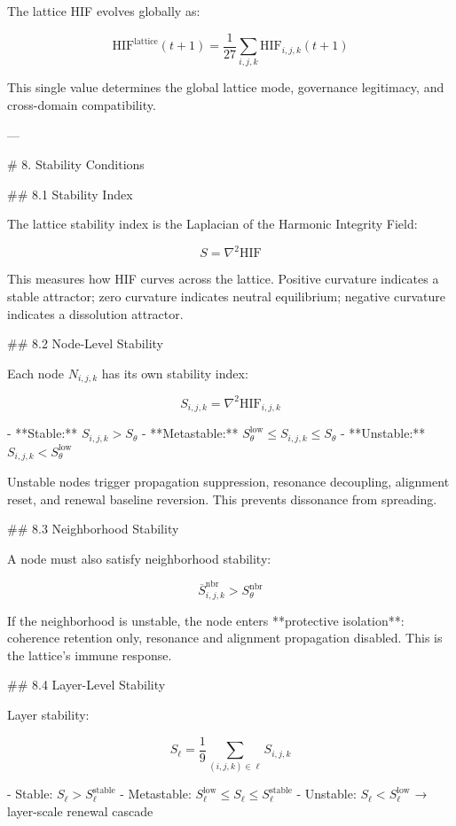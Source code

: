 The lattice HIF evolves globally as:

\[
\mathrm{HIF}^{\text{lattice}}(t+1) = \frac{1}{27} \sum_{i,j,k}
\mathrm{HIF}_{i,j,k}(t+1)
\]

This single value determines the global lattice mode, governance legitimacy, and
cross-domain compatibility.

---

# 8. Stability Conditions

## 8.1 Stability Index

The lattice stability index is the Laplacian of the Harmonic Integrity Field:

\[
S = \nabla^2 \mathrm{HIF}
\]

This measures how HIF curves across the lattice. Positive curvature indicates a
stable attractor; zero curvature indicates neutral equilibrium; negative curvature
indicates a dissolution attractor.

## 8.2 Node-Level Stability

Each node \(N_{i,j,k}\) has its own stability index:

\[
S_{i,j,k} = \nabla^2 \mathrm{HIF}_{i,j,k}
\]

- **Stable:** \(S_{i,j,k} > S_{\theta}\)
- **Metastable:** \(S_{\theta}^{\text{low}} \le S_{i,j,k} \le S_{\theta}\)
- **Unstable:** \(S_{i,j,k} < S_{\theta}^{\text{low}}\)

Unstable nodes trigger propagation suppression, resonance decoupling, alignment
reset, and renewal baseline reversion. This prevents dissonance from spreading.

## 8.3 Neighborhood Stability

A node must also satisfy neighborhood stability:

\[
\overline{S}^{\text{nbr}}_{i,j,k} > S_{\theta}^{\text{nbr}}
\]

If the neighborhood is unstable, the node enters **protective isolation**: coherence
retention only, resonance and alignment propagation disabled. This is the lattice's
immune response.

## 8.4 Layer-Level Stability

Layer stability:

\[
S_{\ell} = \frac{1}{9} \sum_{(i,j,k)\in\ell} S_{i,j,k}
\]

- Stable: \(S_{\ell} > S_{\ell}^{\text{stable}}\)
- Metastable: \(S_{\ell}^{\text{low}} \le S_{\ell} \le S_{\ell}^{\text{stable}}\)
- Unstable: \(S_{\ell} < S_{\ell}^{\text{low}}\) → layer-scale renewal cascade


